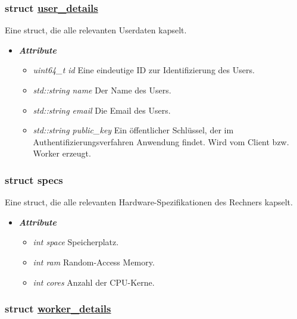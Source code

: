 \documentclass[a4paper,12pt]{article}
\newcommand\purl[1]{\protect\url{#1}}
\begin{document}
\subsubsection{struct \purl{user_details}}

Eine struct, die alle relevanten Userdaten kapselt.

\begin{itemize}[label={}]

	\item \textit{\textbf{Attribute}}
		\begin{itemize}[label={\textbullet}]
			\item \textit{uint64\_t id} Eine eindeutige ID zur Identifizierung des Users.
			
			\item \textit{std::string name} Der Name des Users.
			
			\item \textit{std::string email} Die Email des Users.
			
			\item \textit{std::string public\_key} Ein öffentlicher Schlüssel, der im Authentifizierungsverfahren Anwendung findet. Wird vom Client bzw. Worker erzeugt.
		\end{itemize}


\end{itemize}

\subsubsection{struct specs}

Eine struct, die alle relevanten Hardware-Spezifikationen des Rechners kapselt.


\begin{itemize}[label={}]

	\item \textit{\textbf{Attribute}}
		\begin{itemize}[label={\textbullet}]
			\item \textit{int space} Speicherplatz.
			
			\item \textit{int ram} Random-Access Memory.
			
			\item \textit{int cores} Anzahl der CPU-Kerne.
			
		\end{itemize}


\end{itemize}
\subsubsection{struct \purl{worker_details}}
\end{document}
